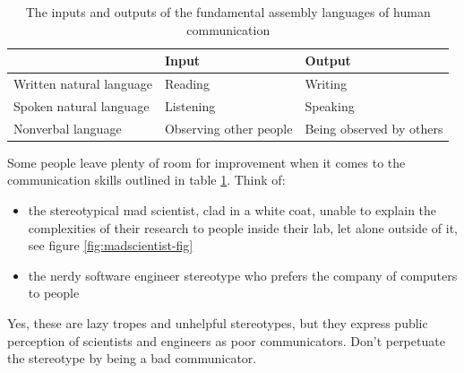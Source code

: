 \documentclass[
]{book}
\providecommand{\tightlist}{%
  \setlength{\itemsep}{0pt}\setlength{\parskip}{0pt}}
\begin{document}
\begin{table}

\caption{\label{tab:iotable}The inputs and outputs of the fundamental assembly languages of human communication }
\centering
\begin{tabular}[t]{lll}
\toprule
 & Input & Output\\
\midrule
Written natural language & Reading & Writing\\
Spoken natural language & Listening & Speaking\\
Nonverbal language & Observing other people & Being observed by others\\
\bottomrule
\end{tabular}
\end{table}

Some people leave plenty of room for improvement when it comes to the communication skills outlined in table \ref{tab:iotable}. Think of:

\begin{itemize}
\tightlist
\item
  the stereotypical mad scientist, clad in a white coat, unable to explain the complexities of their research to people inside their lab, let alone outside of it, see figure \ref{fig:madscientist-fig}
\item
  the nerdy software engineer stereotype who prefers the company of computers to people
\end{itemize}

Yes, these are lazy tropes and unhelpful stereotypes, but they express public perception of scientists and engineers as poor communicators. Don't perpetuate the stereotype by being a bad communicator.
\end{document}
